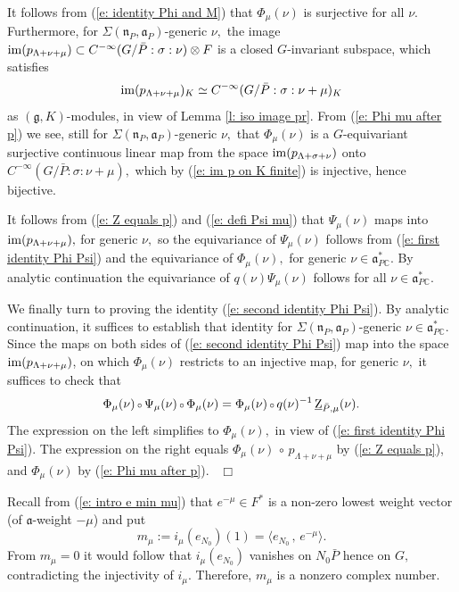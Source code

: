 \documentclass[12pt,a4paper]{article}
\def\qed{~\hfill\hbox{$\Box$}\medbreak}
\def\msy#1{{\mathbb #1}}
\def\C{{\msy C}}
\def\gs{\sigma}
\def\gS{\Sigma}
\def\got#1{\mathfrak #1}
\def\fa{{\got a}}
\def\fg{{\got g}}
\def\fn{{\got n}}
\def\inp#1#2{\langle#1\,,\,#2\rangle}
\def\after{\,{\scriptstyle\circ}\,}
\def\iC{{\scriptscriptstyle \C}}
\numberwithin{Thm}{section}
\numberwithin{equation}{section}
\def\faPdc{{\fa_{P\iC}^*}}
\def\gL{\Lambda}
\numberwithin{equation}{section}
\def\gL{\Lambda}
\def\faPdc{\fa_{P\iC}^*}
\def\faP{\fa_P}
\def\ulZ{\, \underline{\rm Z}}
\begin{document}
It follows from (\ref{e: identity Phi and M}) that $\Phi_\mu(\nu)$ is surjective for all $\nu.$ 
Furthermore, for $\gS(\fn_P, \faP)$-generic $\nu,$ the image  
$
{\rm im}(p_{\gL +  \nu+ \mu}) \subset C^{-\infty}(G/\bar P:\gs:\nu) \otimes F
$  is a closed $G$-invariant subspace, which  satisfies 
\begin{equation}
\label{e: im p on K finite}
{\rm im}(p_{\gL +  \nu+ \mu})_K \simeq C^{-\infty}(G/\bar P: \gs: \nu + \mu)_K
\end{equation}
as $(\fg, K)$-modules, in view of Lemma \ref{l: iso image pr}. 
From (\ref{e: Phi mu after p}) we see, 
still for $\gS(\fn_P, \faP)$-generic $\nu, $ that 
$\Phi_\mu(\nu)$ is a $G$-equivariant surjective continuous linear map from the space ${\rm im}(p_{\gL + \gs + \nu})$ onto $C^{-\infty}(G/\bar P: \gs: \nu + \mu),$ which by (\ref{e: im p on K finite}) is injective,
hence bijective.

It follows from (\ref{e: Z equals p}) and (\ref{e: defi Psi mu}) that 
$\Psi_\mu(\nu)$ maps into ${\rm im}(p_{\gL + \nu + \mu}),$ for generic $\nu,$ 
so the equivariance of $\Psi_\mu(\nu)$ follows from (\ref{e: first identity Phi Psi}) and 
the equivariance of $\Phi_\mu(\nu),$ for generic $\nu \in \faPdc.$ By analytic continuation 
the equivariance of $q(\nu) \Psi_\mu(\nu)$ follows for all $\nu \in \faPdc.$ 

We finally turn to proving the identity (\ref{e: second identity Phi Psi}). By analytic continuation, it suffices to establish that identity for $\gS(\fn_P, \faP)$-generic $\nu \in \faPdc.$ Since the maps on both sides of (\ref{e: second identity Phi Psi}) map into the space ${\rm im} (p_{\gL + \nu +\mu})$,  on which 
%
$\Phi_\mu(\nu)$ restricts to an injective map, for generic $\nu,$ it suffices to check that 
$$ 
\Phi_\mu(\nu)\after \Psi_\mu(\nu) \after \Phi_\mu(\nu)  =  \Phi_\mu(\nu) \after q(\nu)^{-1} \ulZ_{\bar P, \mu}(\nu).
$$%
The expression on the left simplifies to $\Phi_\mu(\nu),$ in view of (\ref{e: first identity Phi Psi}). The expression on 
the right equals $\Phi_\mu(\nu) \after p_{\gL + \nu + \mu}$ by (\ref{e: Z equals p}), and
$\Phi_\mu(\nu)$ by  (\ref{e: Phi mu after p}).
\qed

%
Recall from (\ref{e: intro e min mu}) that $e^{-\mu}\in F^*$ is a
non-zero lowest weight vector (of $\fa$-weight $-\mu$)
and put 
$$
m_\mu := i_\mu(e_{N_0})(1) = \inp{e_{N_0}}{e^{-\mu}}.
$$
 From $m_\mu = 0$ it would follow
that $i_\mu(e_{N_0})$ vanishes on $N_0 \bar P$ hence on $G,$ contradicting the injectivity of 
$i_\mu.$ Therefore, $m_\mu$ is a nonzero complex number. 
\end{document}
